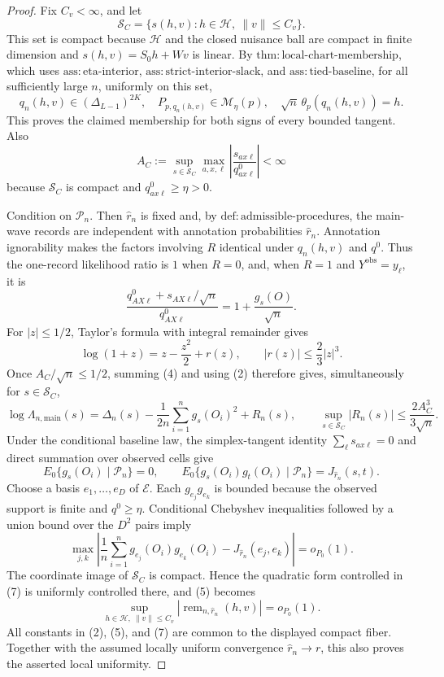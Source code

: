 \documentclass{article}
\begin{document}
\begin{proof}
Fix \(C_v<\infty\), and let
\[
 \mathcal S_C=\{s(h,v):h\in\mathcal H,\ \lVert v\rVert\leq C_v\}.
\]
This set is compact because \(\mathcal H\) and the closed nuisance ball are compact in finite dimension and \(s(h,v)=S_0h+Wv\) is linear.  By \(\mathrm{thm:local\text{-}chart\text{-}membership}\), which uses \(\mathrm{ass:eta\text{-}interior}\), \(\mathrm{ass:strict\text{-}interior\text{-}slack}\), and \(\mathrm{ass:tied\text{-}baseline}\), for all sufficiently large \(n\), uniformly on this set,
\[
 q_n(h,v)\in(\Delta_{L-1})^{2K},\quad
 P_{p,q_n(h,v)}\in\mathcal M_\eta(p),\quad
 \sqrt n\,\theta_p(q_n(h,v))=h.                                     \tag{1}
\]
This proves the claimed membership for both signs of every bounded tangent.  Also
\[
 A_C:=\sup_{s\in\mathcal S_C}\max_{a,x,\ell}
 \left|\frac{s_{ax\ell}}{q^0_{ax\ell}}\right|<\infty                 \tag{2}
\]
because \(\mathcal S_C\) is compact and \(q^0_{ax\ell}\geq\eta>0\).

Condition on \(\mathscr P_n\).  Then \(\widehat r_n\) is fixed and, by \(\mathrm{def:admissible\text{-}procedures}\), the main-wave records are independent with annotation probabilities \(\widehat r_n\).  Annotation ignorability makes the factors involving \(R\) identical under \(q_n(h,v)\) and \(q^0\).  Thus the one-record likelihood ratio is \(1\) when \(R=0\), and, when \(R=1\) and \(Y^{\mathrm{obs}}=y_\ell\), it is
\[
 \frac{q^0_{AX\ell}+s_{AX\ell}/\sqrt n}{q^0_{AX\ell}}
 =1+\frac{g_s(O)}{\sqrt n}.                                         \tag{3}
\]
For \(|z|\leq1/2\), Taylor's formula with integral remainder gives
\[
 \log(1+z)=z-\frac{z^2}{2}+r(z),\qquad |r(z)|\leq\frac23|z|^3.       \tag{4}
\]
Once \(A_C/\sqrt n\leq1/2\), summing (4) and using (2) therefore gives, simultaneously for \(s\in\mathcal S_C\),
\[
 \log\Lambda_{n,\mathrm{main}}(s)
 =\Delta_n(s)-\frac1{2n}\sum_{i=1}^ng_s(O_i)^2+R_n(s),\qquad
 \sup_{s\in\mathcal S_C}|R_n(s)|\leq\frac{2A_C^3}{3\sqrt n}.       \tag{5}
\]
Under the conditional baseline law, the simplex-tangent identity \(\sum_\ell s_{ax\ell}=0\) and direct summation over observed cells give
\[
 E_0\{g_s(O_i)\mid\mathscr P_n\}=0,\qquad
 E_0\{g_s(O_i)g_t(O_i)\mid\mathscr P_n\}=J_{\widehat r_n}(s,t).     \tag{6}
\]
Choose a basis \(e_1,\ldots,e_D\) of \(\mathcal E\).  Each \(g_{e_j}g_{e_k}\) is bounded because the observed support is finite and \(q^0\geq\eta\).  Conditional Chebyshev inequalities followed by a union bound over the \(D^2\) pairs imply
\[
 \max_{j,k}\left|\frac1n\sum_{i=1}^ng_{e_j}(O_i)g_{e_k}(O_i)
 -J_{\widehat r_n}(e_j,e_k)\right|=o_{P_0}(1).                       \tag{7}
\]
The coordinate image of \(\mathcal S_C\) is compact.  Hence the quadratic form controlled in (7) is uniformly controlled there, and (5) becomes
\[
 \sup_{h\in\mathcal H,\ \lVert v\rVert\leq C_v}
 |\operatorname{rem}_{n,\widehat r_n}(h,v)|=o_{P_0}(1).              \tag{8}
\]
All constants in (2), (5), and (7) are common to the displayed compact fiber.  Together with the assumed locally uniform convergence \(\widehat r_n\to r\), this also proves the asserted local uniformity.


\end{proof}
\end{document}
